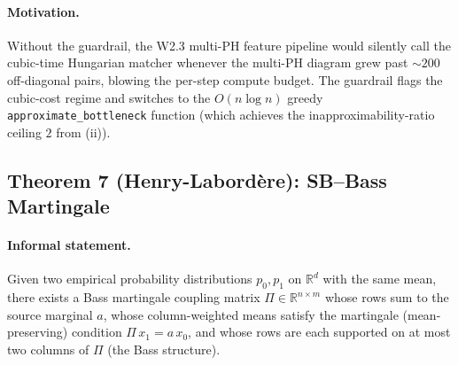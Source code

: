 \paragraph{Motivation.}
Without the guardrail, the W2.3 multi-PH feature pipeline would
silently call the cubic-time Hungarian matcher whenever the
multi-PH diagram grew past $\sim 200$ off-diagonal pairs, blowing
the per-step compute budget.  The guardrail flags the cubic-cost
regime and switches to the $O(n \log n)$ greedy
\texttt{approximate\_bottleneck} function (which achieves the
inapproximability-ratio ceiling $2$ from (ii)).

\subsection{Theorem 7 (Henry-Labordère): SB--Bass Martingale}
\label{sec:math:T7}

\paragraph{Informal statement.}
Given two empirical probability distributions $p_0, p_1$ on
$\mathbb{R}^d$ with the same mean, there exists a Bass martingale
coupling matrix $\Pi \in \mathbb{R}^{n \times m}$ whose rows sum to
the source marginal $a$, whose column-weighted means satisfy the
martingale (mean-preserving) condition $\Pi \, x_1 = a \, x_0$, and
whose rows are each supported on at most two columns of $\Pi$ (the
Bass structure).


